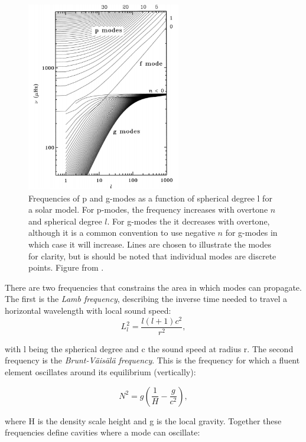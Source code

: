 \begin{figure}[t]
    \centering
    \includegraphics[width=0.6\textwidth]{pandgmodes.png}
    \caption{Frequencies of p and g-modes as a function of spherical degree l for a solar model. For p-modes, the frequency increases with overtone $n$ and spherical degree $l$. For g-modes the it decreases with overtone, although it is a common convention to use negative $n$ for g-modes in which case it will increase. Lines are chosen to illustrate the modes for clarity, but is should be noted that individual modes are discrete points. Figure from \citet{aerts2010}. }
    \label{pandgmodes}
\end{figure}


There are two frequencies that constrains the area in which modes can propagate. The first is the \textit{Lamb frequency}, describing the inverse time needed to travel a horizontal wavelength with local sound speed: 
\begin{equation}
    L_l^{2} = \frac{l(l+1)c^2}{r^2},
\end{equation}

\noindent with l being the spherical degree and c the sound speed at radius r. The second frequency is the \textit{Brunt-Väisälä frequency}. This is the frequency for which a fluent element oscillates around its equilibrium (vertically): 

\begin{equation}
    N^2 = g\left(\frac{1}{H}-\frac{g}{c^2}\right),
\end{equation}

\noindent where H is the density scale height and g is the local gravity.
Together these frequencies define cavities where a mode can oscillate: 

